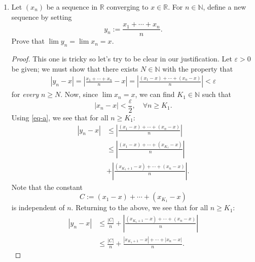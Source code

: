\documentclass[12pt, reqno]{article}
\numberwithin{equation}{section}
\theoremstyle{definition}
\theoremstyle{remark}
\newcommand{\NN}{\mathbb{N}}
\newcommand{\RR}{\mathbb{R}}
\newcommand{\abs}[1]{\left\lvert#1\right\rvert}
\renewcommand{\epsilon}{\varepsilon}
\begin{document}
\begin{enumerate}[leftmargin=*]
\begin{proof}
\[			      x_{n+1} = x_n + \frac{1}{x_n} > x_n \geq a.
		      \]
		      Thus, by the principle of induction, we see that $x_n \geq a$ for all $n \in \NN$. If $x_n$ converges to some point $x \in \RR$, we must then have $x \geq a$ (since $x_n \geq a$ for all $n \in \NN$). In particular, $x > 0$. Thus, by the limit laws, one has
		      \[
			      x = x + \frac{1}{x}.
		      \]
		      But this equation forces $0 = \frac{1}{x}$, which is a contradiction. Hence, $(x_n)$ cannot converge.
	      \end{proof}
	\item Let $(x_n)$ be a sequence in $\RR$ converging to $x \in \RR$. For $n \in \NN$, define a new sequence by setting
	      \[
		      y_n := \frac{x_1 + \cdots + x_n}{n}.
	      \]
	      Prove that $\lim{y_n} = \lim{x_n} = x$.
	      \begin{proof}
		      This one is tricky so let's try to be clear in our justification. Let $\epsilon > 0$ be given; we must show that there exists $N \in \NN$ with the property that
		      \begin{align}\label{eq-a}
			      \abs{ y_n - x } = \abs{ \frac{x_1 + \cdots + x_n}{n}  - x} = \abs{ \frac{(x_1-x) + \cdots + (x_n - x)}{n} } < \epsilon
		      \end{align}
		      for \emph{every} $n \geq N$. Now, since $\lim{x_n} = x$, we can find $K_1 \in \NN$ such that
		      \[
			      \abs{ x_n - x } < \frac{\epsilon}{2}, \quad \forall n \geq K_1.
		      \]
		      Using \eqref{eq-a}, we see that for all $n \geq K_1$:
		      \begin{align*}
			      \abs{ y_n - x } & \leq \abs{ \frac{(x_1-x) + \cdots + (x_n - x)}{n} }         \\
			                      & \leq \abs{\frac{ (x_1 - x) + \cdots + (x_{K_1} - x) }{n}}   \\
			                      & + \abs{\frac{ (x_{K_1 +1} - x)  + \cdots + (x_n - x) }{n}}.
		      \end{align*}
		      Note that the constant $$C := (x_1 - x) + \cdots + (x_{K_1} - x) $$ is independent of $n$. Returning to the above, we see that for all $n \geq K_1$:
		      \begin{align}\label{eq:b}
			      \abs{ y_n - x } & \leq \frac{\abs{C}}{n} + \abs{\frac{ (x_{K_1 +1} - x)  + \cdots + (x_n - x) }{n}}                  \\
			                      & \leq \frac{\abs{C}}{n} + {\frac{ \abs{x_{K_1 +1} - x}  + \cdots + \abs{x_n - x} }{n}}.\label{eq:c}
		      \end{align}

\end{proof}
\end{enumerate}
\end{document}
